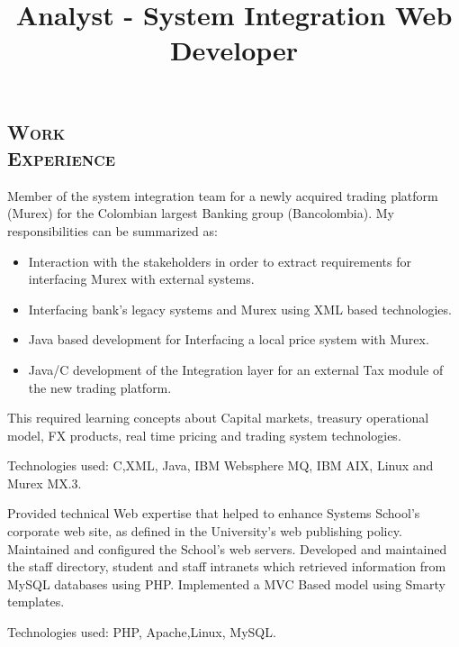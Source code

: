 \begin{resume}
\section{\textsc{Work\\ Experience}}

\title{\textbf{Analyst - System Integration} }
\begin{position}
Member of the system integration team for a newly acquired  trading
platform (Murex) for the Colombian largest Banking group (Bancolombia). 
My responsibilities can be summarized as:
\begin{itemize}
\item {Interaction with the stakeholders in order to extract requirements for interfacing Murex with external systems.}
\item {Interfacing bank's legacy systems and Murex using XML based technologies.}
\item {Java  based development for Interfacing  a local price system  with Murex.}
\item {Java/C  development of the Integration layer for an external Tax module of the new trading platform.}
\end{itemize} 
This required learning concepts about  Capital markets, treasury operational model, FX products, real time
pricing and trading system technologies.

Technologies used:
C,XML, Java, IBM  Websphere MQ, IBM AIX, Linux and Murex MX.3.
\end{position}

\title{\textbf{Web Developer} }
\begin{position}
Provided technical Web expertise that helped to enhance Systems School's corporate web site, 
as defined in the University's web publishing policy. Maintained and
configured the School's web servers. Developed and maintained the
staff directory, student and staff intranets which retrieved
information from MySQL databases using PHP. Implemented a MVC Based
model using Smarty templates.

Technologies used:
PHP, Apache,Linux, MySQL.
\end{position}


\end{resume}

